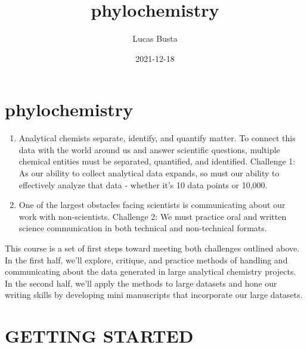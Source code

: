\documentclass[
]{krantz}
\title{phylochemistry}
\author{Lucas Busta}
\date{2021-12-18}
\begin{document}
\maketitle

{
\setcounter{tocdepth}{2}
\tableofcontents
}
\hypertarget{section}{%
\section*{}\label{section}}

\hypertarget{phylochemistry}{%
\section*{phylochemistry}\label{phylochemistry}}

\begin{enumerate}
\def\labelenumi{\arabic{enumi}.}
\item
  Analytical chemists separate, identify, and quantify matter. To connect this data with the world around us and answer scientific questions, multiple chemical entities must be separated, quantified, and identified. Challenge 1: As our ability to collect analytical data expands, so must our ability to effectively analyze that data - whether it's 10 data points or 10,000.
\item
  One of the largest obstacles facing scientists is communicating about our work with non-scientists. Challenge 2: We must practice oral and written science communication in both technical and non-technical formats.
\end{enumerate}

This course is a set of first steps toward meeting both challenges outlined above. In the first half, we'll explore, critique, and practice methods of handling and communicating about the data generated in large analytical chemistry projects. In the second half, we'll apply the methods to large datasets and hone our writing skills by developing mini manuscripts that incorporate our large datasets.

\hypertarget{section-1}{%
\section*{}\label{section-1}}

\hypertarget{getting-started}{%
\section*{GETTING STARTED}\label{getting-started}}
\end{document}
